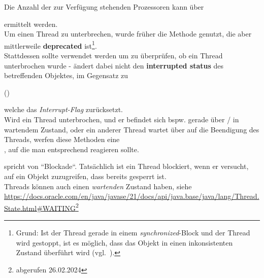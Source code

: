 \noindent
Die Anzahl der zur Verfügung stehenden Prozessoren kann über

\begin{center}
\end{center}

ermittelt werden.\\

\noindent
Um einen Thread zu unterbrechen, wurde früher die Methode  genutzt, die aber mittlerweile \textbf{deprecated} ist\footnote{
Grund: Ist der Thread gerade in einem \textit{synchronized}-Block und der Thread wird gestoppt, ist es möglich, dass das Objekt in einen inkonsistenten Zustand überführt wird (vgl.~\cite[40]{Oec22}).
}.\\
Stattdessen sollte  verwendet werden um zu überprüfen, ob ein Thread unterbrochen wurde -  ändert dabei nicht den \textbf{interrupted status} des betreffenden Objektes, im Gegensatz zu
\begin{center}
 ()
\end{center}
welche das \textit{Interrupt-Flag} zurücksetzt.\\

\noindent
Wird ein Thread unterbrochen, und er befindet sich bspw. gerade über  /  in wartendem Zustand, oder ein anderer Thread wartet über  auf die Beendigung des Threads, werfen diese Methoden eine\\
, auf die man entsprechend reagieren sollte.

\begin{tcolorbox}[colback=red!20,color=white,title=Anmerkung]
    \cite[42]{Oec22} spricht von ``Blockade``.
    Tatsächlich ist ein Thread blockiert, wenn er versucht, auf ein Objekt zuzugreifen, dass bereits gesperrt ist.\\
    Threads können auch einen \textit{wartenden} Zustand haben, siehe \url{https://docs.oracle.com/en/java/javase/21/docs/api/java.base/java/lang/Thread.State.html#WAITING}\footnote{abgerufen 26.02.2024}
\end{tcolorbox}



